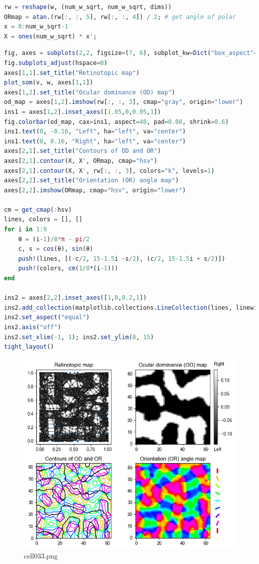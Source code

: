 \begin{lstlisting}[language=julia]
rw = reshape(w, (num_w_sqrt, num_w_sqrt, dims))
ORmap = atan.(rw[:, :, 5], rw[:, :, 4]) / 2; # get angle of polar 
x = 0:num_w_sqrt-1
X = ones(num_w_sqrt) * x';
\end{lstlisting}
\begin{lstlisting}[language=julia]
fig, axes = subplots(2,2, figsize=(7, 6), subplot_kw=Dict("box_aspect"=>1))#, adjustable="box", aspect=1)
fig.subplots_adjust(hspace=0)
axes[1,1].set_title("Retinotopic map")
plot_som(v, w, axes[1,1])
axes[1,2].set_title("Ocular dominance (OD) map")
od_map = axes[1,2].imshow(rw[:, :, 3], cmap="gray", origin="lower")
ins1 = axes[1,2].inset_axes([1.05,0,0.05,1])
fig.colorbar(od_map, cax=ins1, aspect=40, pad=0.08, shrink=0.6)
ins1.text(0, -0.16, "Left", ha="left", va="center")
ins1.text(0, 0.16, "Right", ha="left", va="center")
axes[2,1].set_title("Contours of OD and OR")
axes[2,1].contour(X, X', ORmap, cmap="hsv")
axes[2,1].contour(X, X', rw[:, :, 3], colors="k", levels=1)
axes[2,2].set_title("Orientation (OR) angle map")
axes[2,2].imshow(ORmap, cmap="hsv", origin="lower")

cm = get_cmap(:hsv)
lines, colors = [], []
for i in 1:9
    θ = (i-1)/8*π - pi/2
    c, s = cos(θ), sin(θ)
    push!(lines, [(-c/2, 15-1.5i -s/2), (c/2, 15-1.5i + s/2)])
    push!(colors, cm(1/8*(i-1)))
end

ins2 = axes[2,2].inset_axes([1,0,0.2,1])
ins2.add_collection(matplotlib.collections.LineCollection(lines, linewidths=3,color=colors))
ins2.set_aspect("equal")
ins2.axis("off")
ins2.set_xlim(-1, 1); ins2.set_ylim(0, 15)
tight_layout()
\end{lstlisting}
\begin{figure}[ht]
	\centering
	\includegraphics[scale=0.8, max width=\linewidth]{./fig/local-learning-rule/self-organizing-map/cell033.png}
	\caption{cell033.png}
	\label{cell033.png}
\end{figure}
